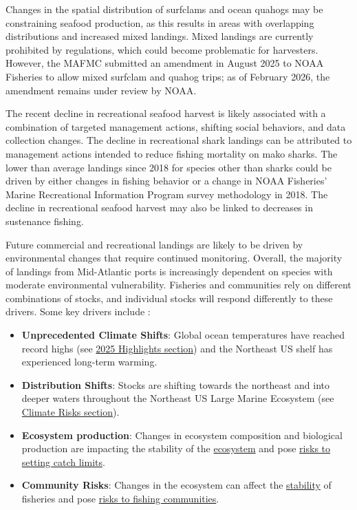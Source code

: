 \documentclass[
  10pt,
]{article}
\providecommand{\tightlist}{%
  \setlength{\itemsep}{0pt}\setlength{\parskip}{0pt}}
\begin{document}
Changes in the spatial distribution of surfclams and ocean quahogs may be constraining seafood production, as this results in areas with overlapping distributions and increased mixed landings. Mixed landings are currently prohibited by regulations, which could become problematic for harvesters. However, the MAFMC submitted an amendment in August 2025 to NOAA Fisheries to allow mixed surfclam and quahog trips; as of February 2026, the amendment remains under review by NOAA.

The recent decline in recreational seafood harvest is likely associated with a combination of targeted management actions, shifting social behaviors, and data collection changes. The decline in recreational shark landings can be attributed to management actions intended to reduce fishing mortality on mako sharks. The lower than average landings since 2018 for species other than sharks could be driven by either changes in fishing behavior or a change in NOAA Fisheries' Marine Recreational Information Program survey methodology in 2018. The decline in recreational seafood harvest may also be linked to decreases in sustenance fishing.

Future commercial and recreational landings are likely to be driven by environmental changes that require continued monitoring. Overall, the majority of landings from Mid-Atlantic ports is increasingly dependent on species with moderate environmental vulnerability. Fisheries and communities rely on different combinations of stocks, and individual stocks will respond differently to these drivers. Some key drivers include :

\begin{itemize}
\tightlist
\item
  \textbf{Unprecedented Climate Shifts}: Global ocean temperatures have reached record highs (see \hyperref[highlights]{2025 Highlights section}) and the Northeast US shelf has experienced long-term warming.
\item
  \textbf{Distribution Shifts}: Stocks are shifting towards the northeast and into deeper waters throughout the Northeast US Large Marine Ecosystem (see \hyperref[climate-and-ecosystem-change]{Climate Risks section}).
\item
  \textbf{Ecosystem production}: Changes in ecosystem composition and biological production are impacting the stability of the \hyperref[stability]{ecosystem} and pose \hyperref[risks-to-setting-catch-limits]{risks to setting catch limits}.
\item
  \textbf{Community Risks}: Changes in the ecosystem can affect the \hyperref[stability]{stability} of fisheries and pose \hyperref[community-social-and-climate-vulnerability]{risks to fishing communities}.
\end{itemize}
\end{document}
